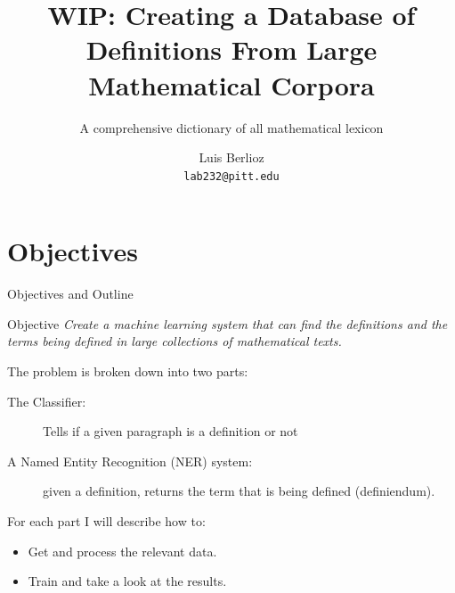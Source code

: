 \documentclass[10pt]{beamer}
\title{WIP: Creating a Database of Definitions From Large Mathematical Corpora}
\subtitle{A comprehensive dictionary of all mathematical lexicon}
\author{Luis Berlioz\\
\texttt{lab232@pitt.edu}}
\institute{University of Pittsburgh}
\begin{document}
\begin{frame}
\titlepage
\end{frame}
\section{Objectives}

\begin{frame}{Objectives and Outline}
    \begin{block}{Objective}
    \textit{Create a machine learning system that can find the definitions and the terms being defined in large collections of mathematical texts. }
    \end{block}


    The problem is broken down into two parts:
\begin{description}
    \item[The Classifier:] Tells if a given paragraph is a definition or not
    \item[A Named Entity Recognition (NER) system:] given a definition, returns the term that is being defined (definiendum).
\end{description}
For each part I will describe how to:
        \begin{itemize}
                \item Get and process the relevant  data.
                \item Train and take a look at the results.
        \end{itemize}
\end{frame}
\end{document}
